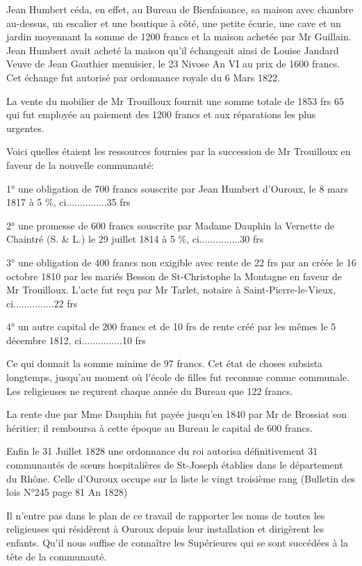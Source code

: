 Jean Humbert céda, en effet, au Bureau de Bienfaisance, sa maison avec chambre au-dessus, un escalier et une boutique à côté, une petite écurie, une cave et un jardin moyennant la somme de 1200 francs et la maison achetée par Mr Guillain. Jean Humbert avait acheté la maison qu'il échangeait ainsi de Louise Jandard Veuve de Jean Gauthier menuisier, le 23 Nivose An VI au prix de 1600 francs. Cet échange fut autorisé par ordonnance royale du 6 Mars 1822.

La vente du mobilier de Mr Trouilloux fournit une somme totale de 1853 frs 65 qui fut employée au paiement des 1200 francs et aux réparations les plus urgentes.

Voici quelles étaient les ressources fournies par la succession de Mr Trouilloux en faveur de la nouvelle communauté:

1° une obligation de 700 francs souscrite par Jean Humbert d'Ouroux, le 8 mars 1817 à 5 \%, ci...............35 frs

2° une promesse de 600 francs souscrite par Madame Dauphin la Vernette de Chaintré (S. \& L.) le 29 juillet 1814 à 5 \%, ci...............30 frs

3° une obligation de 400 francs non exigible avec rente de 22 frs par an créée le 16 octobre 1810 par les mariés Besson de St-Christophe la Montagne en faveur de Mr Trouilloux. L'acte fut reçu par Mr Tarlet, notaire à Saint-Pierre-le-Vieux, ci...............22 frs

4° un autre capital de 200 francs et de 10 frs de rente créé par les mêmes le 5 décembre 1812, ci...............10 frs

Ce qui donnait la somme minime de 97 francs. Cet état de choses subsista longtemps, jusqu'au moment où l'école de filles fut reconnue comme communale. Les religieuses ne reçurent chaque année du Bureau que 122 francs.

La rente due par Mme Dauphin fut payée jusqu'en 1840 par Mr de Brossiat son héritier; il remboursa à cette époque au Bureau le capital de 600 francs.

Enfin le 31 Juillet 1828 une ordonnance du roi autorisa définitivement 31 communautés de sœurs hospitalières de St-Joseph établies dans le département du Rhône. Celle d'Ouroux occupe sur la liste le
vingt troisième rang (Bulletin des lois N°245 page 81 An 1828)

Il n'entre pas dans le plan de ce travail de rapporter les noms de toutes les religieuses qui résidèrent à Ouroux depuis leur installation et dirigèrent les enfants. Qu'il nous suffise de connaître les Supérieures qui se sont succédées à la tête de la communauté.

